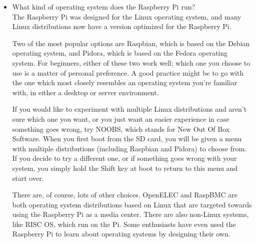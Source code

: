 \begin{itemize}
	\item What kind of operating system does the Raspberry Pi run?\\
	
	The Raspberry Pi was designed for the Linux operating system, and many Linux distributions now have a version optimized for the Raspberry Pi.
	
	Two of the most popular options are Raspbian, which is based on the Debian operating system, and Pidora, which is based on the Fedora operating system. For beginners, either of these two work well; which one you choose to use is a matter of personal preference. A good practice might be to go with the one which most closely resembles an operating system you’re familiar with, in either a desktop or server environment.
	
	If you would like to experiment with multiple Linux distributions and aren't sure which one you want, or you just want an easier experience in case something goes wrong, try NOOBS, which stands for New Out Of Box Software. When you first boot from the SD card, you will be given a menu with multiple distributions (including Raspbian and Pidora) to choose from. If you decide to try a different one, or if something goes wrong with your system, you simply hold the Shift key at boot to return to this menu and start over.
	
	There are, of course, lots of other choices. OpenELEC and RaspBMC are both operating system distributions based on Linux that are targeted towards using the Raspberry Pi as a media center. There are also non-Linux systems, like RISC OS, which run on the Pi. Some enthusiasts have even used the Raspberry Pi to learn about operating systems by designing their own.
\end{itemize}

